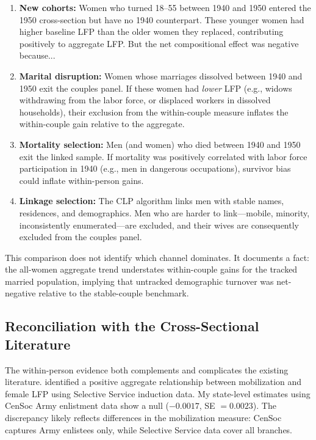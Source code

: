 \documentclass[12pt]{article}
\begin{document}
\begin{enumerate}
\item \textbf{New cohorts:} Women who turned 18--55 between 1940 and 1950 entered the 1950 cross-section but have no 1940 counterpart. These younger women had higher baseline LFP than the older women they replaced, contributing positively to aggregate LFP. But the net compositional effect was negative because...
\item \textbf{Marital disruption:} Women whose marriages dissolved between 1940 and 1950 exit the couples panel. If these women had \textit{lower} LFP (e.g., widows withdrawing from the labor force, or displaced workers in dissolved households), their exclusion from the within-couple measure inflates the within-couple gain relative to the aggregate.
\item \textbf{Mortality selection:} Men (and women) who died between 1940 and 1950 exit the linked sample. If mortality was positively correlated with labor force participation in 1940 (e.g., men in dangerous occupations), survivor bias could inflate within-person gains.
\item \textbf{Linkage selection:} The CLP algorithm links men with stable names, residences, and demographics. Men who are harder to link---mobile, minority, inconsistently enumerated---are excluded, and their wives are consequently excluded from the couples panel.
\end{enumerate}

This comparison does not identify which channel dominates. It documents a fact: the all-women aggregate trend understates within-couple gains for the tracked married population, implying that untracked demographic turnover was net-negative relative to the stable-couple benchmark.

\subsection{Reconciliation with the Cross-Sectional Literature}

The within-person evidence both complements and complicates the existing literature. \citet{acemoglu2004women} identified a positive aggregate relationship between mobilization and female LFP using Selective Service induction data. My state-level estimates using CenSoc Army enlistment data show a null ($-0.0017$, SE $= 0.0023$). The discrepancy likely reflects differences in the mobilization measure: CenSoc captures Army enlistees only, while Selective Service data cover all branches.
\end{document}
